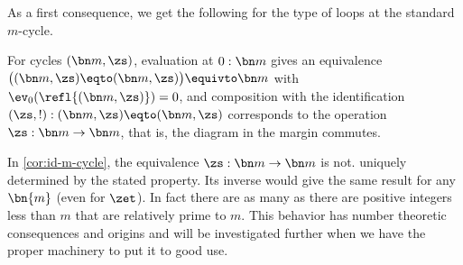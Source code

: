 As a first consequence,
we get the following for the type of loops at the standard $m$-cycle.
\begin{corollary}\label{cor:id-m-cycle}
  For cycles $(\bn m,\zs)$,
  evaluation at $0:\bn m$ gives an equivalence
  $\bigl((\bn m,\zs)\eqto(\bn m,\zs)\bigr) \equivto \bn m$
  with $\ev_0(\refl{(\bn m,\zs)}) = 0$, and
  composition with the identification
$(\zs,!): (\bn m,\zs)\eqto(\bn m,\zs)$
  corresponds to the operation $\zs:\bn m\to\bn m$,
  that is, the diagram in the margin commutes.
\end{corollary}

\begin{remark}\label{rem:thenonuniquenessofgeneratorsofmodulararithmetic1}
  In \cref{cor:id-m-cycle}, the equivalence $\zs:\bn m\to\bn m$ is not.
  uniquely determined by the stated property. Its inverse would give the
  same result for any $\bn{m}$ (even for $\zet$). In fact there are
  as many as there are positive integers less than
  $m$ that are relatively prime to $m$.  This behavior has number theoretic
  consequences and origins and will be investigated further when we
  have the proper machinery to put it to good use.
\end{remark}

